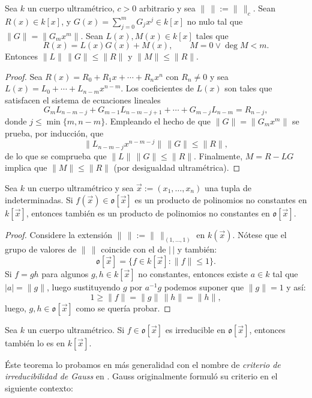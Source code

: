 \documentclass[teoria-numeros.tex]{subfiles}
\begin{document}
\begin{prop}\label{thm:metric_division_alg}
	Sea $k$ un cuerpo ultramétrico, $c > 0$ arbitrario y sea $\|\,\| := \|\,\|_c$.
	Sean $R(x) \in k[x]$, y $G(x) = \sum_{j=0}^{m} G_jx^j \in k[x]$ no nulo tal que $\|G\| = \|G_mx^m\|$.
	Sean $L(x), M(x) \in k[x]$ tales que
	$$ R(x) = L(x)G(x) + M(x), \qquad M = 0 \vee \deg M < m. $$
	Entonces $\|L\|\,\|G\| \le \|R\|$ y $\|M\| \le \|R\|$.
\end{prop}
\begin{proof}
	Sea $R(x) = R_0 + R_1x + \cdots + R_nx^n$ con $R_n \ne 0$ y sea $L(x) = L_0 + \cdots + L_{n-m}x^{n-m}$.
	Los coeficientes de $L(x)$ son tales que satisfacen el sistema de ecuaciones lineales
	$$ G_m L_{n-m-j} + G_{m-1} L_{n-m-j+1} + \cdots + G_{m-j}L_{n-m} = R_{n-j}, $$
	donde $j \le \min\{ m, n-m \}$.
	Empleando el hecho de que $\|G\| = \|G_mx^m\|$ se prueba, por inducción, que
	$$ \| L_{n-m-j}x^{n-m-j} \| \, \|G\| \le \|R\|, $$
	de lo que se comprueba que $\|L\| \, \|G\| \le \|R\|$.
	Finalmente, $M = R - LG$ implica que $\|M\| \le \|R\|$ (por desigualdad ultramétrica).
\end{proof}

\begin{thm}
	Sea $k$ un cuerpo ultramétrico y sea $\vec x := (x_1, \dots, x_n)$ una tupla de indeterminadas.
	Si $f(\vec x) \in \mathfrak{o}[\vec x]$ es un producto de polinomios no constantes en $k[\vec x]$,
	entonces también es un producto de polinomios no constantes en $\mathfrak{o}[\vec x]$.
\end{thm}
\begin{proof}
	Considere la extensión $\|\,\| := \|\,\|_{(1, \dots, 1)}$ en $k(\vec x)$.
	Nótese que el grupo de valores de $\|\,\|$ coincide con el de $|\,|$ y también:
	$$ \mathfrak{o}[\vec x] = \{ f \in k[\vec x] : \|f\| \le 1 \}. $$
	Si $f = gh$ para algunos $g, h\in k[\vec x]$ no constantes, entonces existe $a \in k$ tal que $|a| = \|g\|$,
	luego sustituyendo $g$ por $a^{-1}g$ podemos suponer que $\|g\| = 1$ y así:
	$$ 1 \ge \|f\| = \|g\| \, \|h\| = \|h\|, $$
	luego, $g, h \in \mathfrak{o}[\vec x]$ como se quería probar.
\end{proof}
\begin{cor}
	Sea $k$ un cuerpo ultramétrico.
	Si $f \in \mathfrak{o}[\vec x]$ es irreducible en $\mathfrak{o}[\vec x]$, entonces también lo es en $k[\vec x]$.
\end{cor}
Éste teorema lo probamos en más generalidad con el nombre de \textit{criterio de irreducibilidad de Gauss} en \cite[Teo.~2.86]{Alg}.
Gauss originalmente formuló su criterio en el siguiente contexto:
\end{document}
